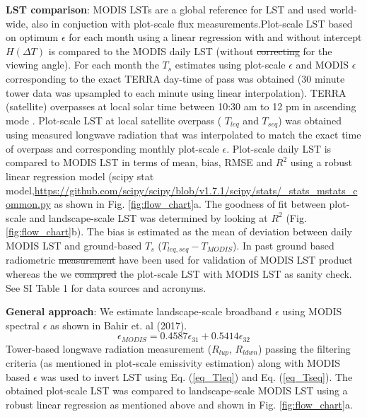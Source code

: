 \documentclass[fleqn,10pt]{wlscirep}
\providecommand{\DIFaddtex}[1]{{\protect\color{blue}\uwave{#1}}} %
\providecommand{\DIFdeltex}[1]{{\protect\color{red}\sout{#1}}}                      %
\providecommand{\DIFaddbegin}{} %
\providecommand{\DIFaddend}{} %
\providecommand{\DIFdelbegin}{} %
\providecommand{\DIFdelend}{} %
\providecommand{\DIFadd}[1]{\texorpdfstring{\DIFaddtex{#1}}{#1}} %
\providecommand{\DIFdel}[1]{\texorpdfstring{\DIFdeltex{#1}}{}} %
\begin{document}
\textbf{LST comparison}: MODIS LSTs are a global reference for LST and used world-wide, also in conjuction with plot-scale flux measurements.Plot-scale LST based on optimum $\epsilon$ for each month using a linear regression with and without intercept $H(\Delta T)$ is compared to the MODIS daily LST (without \DIFdelbegin \DIFdel{correcting }\DIFdelend \DIFaddbegin \DIFadd{correction }\DIFaddend for the viewing angle). For each month the $T_{s}$ estimates using plot-scale $\epsilon$ and MODIS $\epsilon$ corresponding to the exact TERRA day-time of pass was obtained (30 minute tower data was upsampled to each minute using linear interpolation). TERRA (satellite) overpasses at local solar time between 10:30 am to 12 pm in ascending mode \cite{guillevic2017land}. Plot-scale LST at local satellite overpass ( $T_{leq}$ and $T_{seq}$) was obtained using measured longwave radiation that was interpolated to match the exact time of overpass and corresponding monthly plot-scale $\epsilon$. Plot-scale daily LST is compared to MODIS LST in terms of mean, bias, RMSE and $R^2$ using a robust linear regression model (scipy stat model,\url{https://github.com/scipy/scipy/blob/v1.7.1/scipy/stats/_stats_mstats_common.py} 
 as shown in Fig. \ref{fig:flow_chart}a. The goodness of fit between plot-scale and landscape-scale LST was determined by looking at $R^2$ (Fig. \ref{fig:flow_chart}b). The bias is estimated as the mean of deviation between daily MODIS LST and ground-based $T_{s}$ ($T_{leq,seq} - T_{MODIS}$). In \DIFaddbegin \DIFadd{the }\DIFaddend past ground based radiometric \DIFdelbegin \DIFdel{measurement }\DIFdelend \DIFaddbegin \DIFadd{measuremente }\DIFaddend have been used for validation of MODIS LST product \cite{wang2008validating} whereas the we \DIFdelbegin \DIFdel{comapred }\DIFdelend \DIFaddbegin \DIFadd{compared }\DIFaddend the plot-scale LST with MODIS LST as sanity check. See SI Table 1 for data sources and acronyms.

\textbf{General approach}:
We estimate landscape-scale broadband $\epsilon$ using MODIS spectral $\epsilon$ as shown in Bahir et. al (2017)\cite{bahir2017evaluation}.
\begin{equation}\label{eq_emodis}
\epsilon_{MODIS}= 0.4587 \epsilon_{31} + 0.5414 \epsilon_{32}
\end{equation}
Tower-based longwave radiation measurement ($R_{lup}$, $R_{ldwn}$) passing the filtering criteria (as mentioned in plot-scale emissivity estimation) along with MODIS based $\epsilon$ was used to invert LST using Eq. (\ref{eq_Tleq}) and  Eq. (\ref{eq_Tseq}). The obtained plot-scale LST was compared to landscape-scale MODIS LST using a robust linear regression as mentioned above and shown in Fig. \ref{fig:flow_chart}a.
\end{document}
